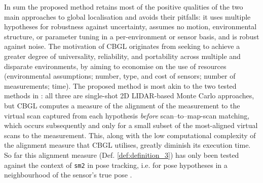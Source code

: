 In sum the proposed method retains most of the positive qualities of the two
main approaches to global localisation and avoids their pitfalls: it uses
multiple hypotheses for robustness against uncertainty, assumes no motion,
environmental structure, or parameter tuning in a per-environment or sensor
basis, and is robust against noise.
The motivation of CBGL originates from seeking to achieve a
greater degree of universality, reliability, and portability across multiple
and disparate environments, by aiming to economise on the use of resources
(environmental assumptions; number, type, and cost of sensors; number of
measurements; time). The proposed method is most akin to the two tested
methods in \cite{Filotheou2022g}: all three are single-shot 2D LIDAR-based
Monte Carlo approaches, but CBGL computes a measure of the alignment of the
measurement to the virtual scan captured from each hypothesis
\textit{before} scan--to--map-scan matching, which occurs subsequently and only
for a small subset of the most-aligned virtual scans to the measurement. This,
along with the low computational complexity of the alignment measure that CBGL
utilises, greatly diminish its execution time. So far this alignment measure
(Def.  \ref{def:definition_3}) has only been tested against the context of
\texttt{sm2} in pose tracking, i.e. for pose hypotheses in a neighbourhood of
the sensor's true pose%
\cite{Filotheou2022f,Filotheou2023a}.
